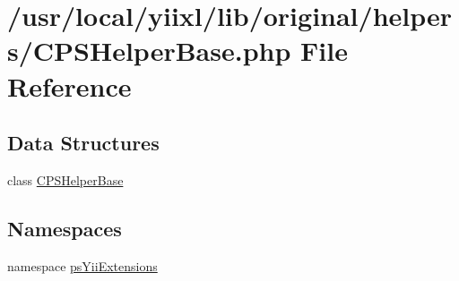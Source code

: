 \hypertarget{CPSHelperBase_8php}{
\section{/usr/local/yiixl/lib/original/helpers/CPSHelperBase.php File Reference}
\label{CPSHelperBase_8php}
}
\subsection*{Data Structures}
\begin{DoxyCompactItemize}
\item 
class \hyperlink{classCPSHelperBase}{CPSHelperBase}
\end{DoxyCompactItemize}
\subsection*{Namespaces}
\begin{DoxyCompactItemize}
\item 
namespace \hyperlink{namespacepsYiiExtensions}{psYiiExtensions}
\end{DoxyCompactItemize}
